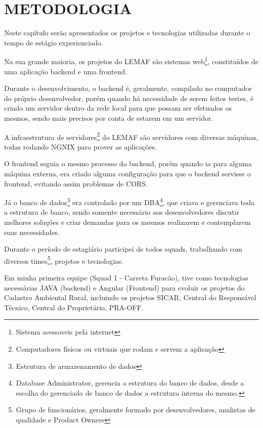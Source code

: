 \chapter{METODOLOGIA}
\label{cap:desenvolvimento}

Neste capítulo serão apresentados os projetos e tecnologias utilizadas durante o tempo de estágio experienciado.

Na sua grande maioria, os projetos do LEMAF são sistemas web\footnote{Sistema acessaveis pela internet}, constituídos de uma aplicação backend e uma frontend.

Durante o desenvolvimento, o backend é, geralmente, compilado no computador do próprio desenvolvedor, porém quando há necessidade de serem feitos testes, é criado um servidor dentro da rede local para que possam ser efetuados os mesmos, sendo mais precisos por conta de estarem em um servidor.

A infraestrutura de servidores\footnote{Computadores físicos ou virtuais que rodam e servem a aplicação} do LEMAF são servidores com diversas máquinas, todas rodando NGNIX para prover as aplicações.

O frontend seguia o mesmo processo do backend, porém quando ia para alguma máquina externa, era criado alguma configuração para que o backend servisse o frontend, evitando assim problemas de CORS.

Já o banco de dados\footnote{Estrutura de armazenamento de dados} era controlado por um DBA\footnote{Database Administrator, gerencia a estrutura do banco de dados, desde a escolha do gerenciado de banco de dados a estrutura interna do mesmo.}, que criava e gerenciava toda a estrutura de banco, sendo somente necessário aos desenvolvedores discutir melhores soluções e criar demandas para os mesmos realizarem e contemplarem suas necessidades.

Durante o período de estagiário participei de todos squads, trabalhando com diversos times\footnote{Grupo de funcionários, geralmente formado por desenvolvedores, analistas de qualidade e Product Owners}, projetos e tecnologias.

Em minha primeira equipe (Squad 1 - Carreta Furacão), tive como tecnologias necessárias JAVA (backend) e Angular (Frontend) para evoluir os projetos do Cadastro Ambiental Rural, incluindo os projetos SICAR, Central do Responsável Técnico, Central do Proprietário, PRA-OFF.

